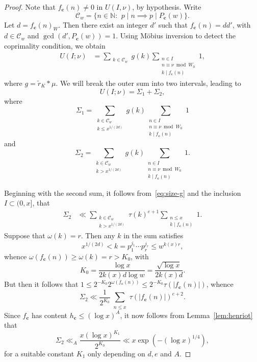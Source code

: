 \documentclass[11pt,letterpaper]{amsart}
\renewcommand{\leq}{\leqslant}
\renewcommand{\geq}{\geqslant}
\theoremstyle{definition}
\numberwithin{equation}{section}
\renewcommand{\c}{\mathbf{c}}
\newcommand{\0}{\mathbf{0}}
\begin{document}
\begin{proof}
 

 Note that $f_\c(n)\neq 0$ in $U(I,\nu)$, by hypothesis.
 Write 
 $$\mathcal{C}_w=\{n\in \mathbb{N}:\,\ p\mid n\implies p\mid P_\c(w)\}.$$
Let $d=f_\c(n)_W$.  Then there exist an integer $d'$ such that $f_\c(n)=dd'$, with 
$d\in \mathcal{C}_w$ and 
$\gcd(d',P_\c(w))=1$. 
Using M\"obius inversion to detect the coprimality condition, we obtain
\begin{align*}
U(I;\nu)
&=\sum_{\substack{k\in \mathcal{C}_w
}} g(k)
\sum_{\substack{n\in I
\\ n\equiv \nu\bmod{W_0}\\ 
k\mid f_\c(n)}} 1,
\end{align*}
where 
$
g=\tilde r_K* \mu$.
We will  break the outer  sum into two intervals, leading to 
\begin{equation}\label{eq:sum-sig123'}
U(I;\nu)=\Sigma_1+\Sigma_2,
\end{equation}
where
\begin{equation}\label{eq:Sigma1'}
\Sigma_1=
\sum_{\substack{k\in \mathcal{C}_w 
\\ k\leq x^{1/(2d)}}} g(k) 	
\sum_{\substack{n\in I
\\ n\equiv \nu\bmod{W_0}\\
k\mid f_\c(n)}} 1
\end{equation}
and 
$$
\Sigma_2=
\sum_{\substack{k\in \mathcal{C}_w 
\\ 
k>x^{1/(2d)}}} 
g(k) 	
\sum_{\substack{n\in I
\\ n\equiv \nu\bmod{W_0}\\
k\mid f_\c(n)}} 1.
$$


Beginning with the second sum, it follows from~\eqref{eq:size-g} and the inclusion  $I\subset (0,x]$, that 
\begin{align*}
\Sigma_2
&\ll
\sum_{\substack{k\in \mathcal{C}_w 
\\ 
k>x^{1/(2d)}}}
\tau(k)^{e+1}
\sum_{\substack{n\leq x\\ k\mid f_\c(n)}} 1.
\end{align*}
Suppose that $\omega(k)=r$. Then any $k$ in the sum satisfies
$$
x^{1/(2d)}<k=p_1^{j_1}\cdots p_{r}^{j_r}\leq w^{k(x)r},
$$
whence $\omega(f_\c(n))\geq \omega(k)=r > K_0$, with 
$$
K_0=\frac{\log x}{2 k(x)d\log w}=\frac{\sqrt{\log x}}{2k(x)d}.
$$
But then it follows that $1\leq 2^{-K_0} 2^{\omega(f_\c(n))}\leq 2^{-K_0} \tau(|f_\c(n)|)$, whence
$$
\Sigma_2
\ll
\frac{1}{2^{K_0}} 
\sum_{\substack{n\leq x}} \tau(|f_\c(n)|)^{e+2}.
$$
Since $f_\c$ has content  $h_\c\leq (\log x)^A$, 
it now follows from Lemma~\ref{lem:henriot} that 
\begin{equation}\label{eq:Sigma2-''}
\Sigma_2
\ll_A
\frac{x(\log x)^{K_1}}{2^{K_0}} 
\ll x\exp\left(-(\log x)^{1/4}\right),
\end{equation}
for a suitable constant $K_1$ only depending on $d,e$ and $A$.




\end{proof}
\end{document}
